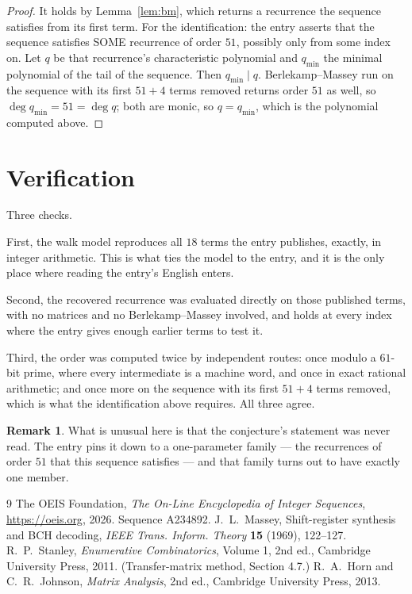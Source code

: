 \documentclass[11pt,a4paper]{article}
\theoremstyle{plain}
\theoremstyle{definition}
\newtheorem{remark}[theorem]{Remark}
\begin{document}
\begin{proof}
It holds by Lemma~\ref{lem:bm}, which returns a recurrence the sequence satisfies from its
first term. For the identification: the entry asserts that the sequence satisfies SOME
recurrence of order $51$, possibly only from some index on. Let $q$ be that recurrence's
characteristic polynomial and $q_{\min}$ the minimal polynomial of the tail of the sequence.
Then $q_{\min}\mid q$. Berlekamp--Massey run on the sequence with its first $51+4$ terms
removed returns order $51$ as well, so $\deg q_{\min}=51=\deg q$; both are monic, so
$q=q_{\min}$, which is the polynomial computed above.
\end{proof}

\section{Verification}

Three checks.

First, the walk model reproduces all $18$ terms the entry publishes, exactly, in integer
arithmetic. This is what ties the model to the entry, and it is the only place where reading
the entry's English enters.

Second, the recovered recurrence was evaluated directly on those published terms, with no
matrices and no Berlekamp--Massey involved, and holds at every index where the entry gives
enough earlier terms to test it.

Third, the order was computed twice by independent routes: once modulo a $61$-bit prime, where
every intermediate is a machine word, and once in exact rational arithmetic; and once more on
the sequence with its first $51+4$ terms removed, which is what the identification above
requires. All three agree.

\begin{remark}
What is unusual here is that the conjecture's statement was never read. The entry pins it down
to a one-parameter family --- the recurrences of order $51$ that this sequence satisfies
--- and that family turns out to have exactly one member.
\end{remark}

\begin{thebibliography}{9}
 The OEIS Foundation, \emph{The On-Line Encyclopedia of Integer
Sequences}, \url{https://oeis.org}, 2026. Sequence A234892.
 J.~L.~Massey, Shift-register synthesis and BCH decoding, \emph{IEEE
Trans. Inform. Theory} \textbf{15} (1969), 122--127.
 R.~P.~Stanley, \emph{Enumerative Combinatorics}, Volume 1, 2nd ed.,
Cambridge University Press, 2011. (Transfer-matrix method, Section 4.7.)
 R.~A.~Horn and C.~R.~Johnson, \emph{Matrix Analysis}, 2nd ed., Cambridge
University Press, 2013.
\end{thebibliography}
\end{document}
